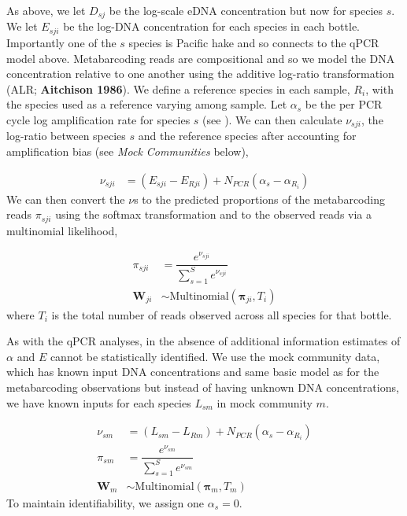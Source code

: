\documentclass{article}
\begin{document}
As above, we let $D_{sj}$ be the log-scale eDNA concentration but now for species $s$. We let $E_{sji}$ be the log-DNA concentration for each species in each bottle. Importantly one of the $s$ species is Pacific hake and so connects to the qPCR model above. Metabarcoding reads are compositional and so we model the DNA concentration relative to one another using the additive log-ratio transformation (ALR; \textbf{Aitchison 1986}).  We define a reference species in each sample, $R_i$, with the species used as a reference varying among sample. Let $\alpha_s$ be the per PCR cycle log amplification rate for species $s$ (see \cite{shelton2023}).  We can then calculate $\nu_{sji}$, the log-ratio between species $s$ and the reference species after accounting for amplification bias (see \textit{Mock Communities} below),

\begin{align} 
  \nu_{sji} &= \left( E_{sji} - E_{Rji}\right) + N_{PCR} \left(\alpha_s - \alpha_{R_i} \right) 
\end{align}
We can then convert the $\nu$s to the predicted proportions of the metabarcoding reads $\pi_{sji}$ using the softmax transformation and to the observed reads via a multinomial likelihood,

\begin{align} 
  \pi_{sji} &= \dfrac{e^{\nu_{sji}}}{\sum_{s=1}^S e^{\nu_{sji}}} \\
  \boldsymbol{W}_{ji} & \sim  \mathrm{Multinomial}\left(\boldsymbol{\pi}_{ji},T_{i}\right) 
\end{align}
where $T_{i}$ is the total number of reads observed across all species for that bottle. 

As with the qPCR analyses, in the absence of additional information estimates of $\alpha$ and $E$ cannot be statistically identified.  We use the mock community data, which has known input DNA concentrations and  same basic model as for the metabarcoding observations but instead of having unknown DNA concentrations, we have known inputs for each species $L_{sm}$ in mock community $m$. 

\begin{align} 
 \nu_{sm} &= \left( L_{sm} - L_{Rm}\right) + N_{PCR} \left(\alpha_s - \alpha_{R_i} \right) \\
  \pi_{sm} &= \dfrac{e^{\nu_{sm}}}{\sum_{s=1}^S e^{\nu_{sm}}} \\
  \boldsymbol{W}_{m} & \sim  \mathrm{Multinomial}\left(\boldsymbol{\pi}_{m},T_{m}\right) 
\end{align}
To maintain identifiability, we assign one $\alpha_s = 0$.
\end{document}
